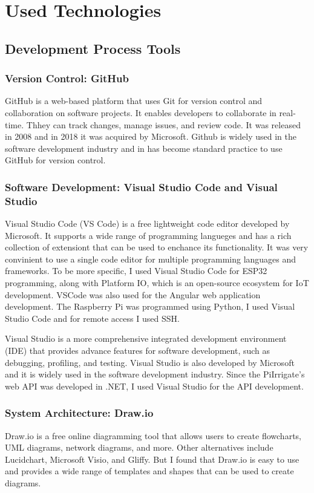 \chapter{Used Technologies}
\section{Development Process Tools}
\subsection{Version Control: GitHub}
GitHub is a web-based platform that uses Git for version control and collaboration on software projects.
It enables developers to collaborate in real-time. Thhey can track changes, manage issues, and review code.
It was released in 2008 and in 2018 it was acquired by Microsoft\cite{githubDefinition}.
Github is widely used in the software development industry and in has become standard practice to 
use GitHub for version control. 

\subsection{Software Development: Visual Studio Code and Visual Studio}
Visual Studio Code (VS Code) is a free lightweight code editor developed by Microsoft.
It supports a wide range of programming langueges and has a rich collection of extensiont that can be used to 
enchance its functionality\cite{vscode}.
It was very convinient to use a single code editor for multiple programming languages and frameworks.
To be more specific, I used Visual Studio Code for ESP32 programming, along with Platform IO, 
which is an open-source ecosystem for IoT development. VSCode was also used for the Angular web application 
development. The Raspberry Pi was programmed using Python, I used Visual Studio Code and for remote access
I used SSH.

Visual Studio is a more comprehensive integrated development environment (IDE) that provides advance features
for software development, such as debugging, profiling, and testing.
Visual Studio is also developed by Microsoft and it is widely used in the software development industry.
Since the PiIrrigate's web API was developed in .NET, I used Visual Studio for the API development\cite{vs}.

\subsection{System Architecture: Draw.io}
Draw.io is a free online diagramming tool that allows users to create flowcharts, 
UML diagrams, network diagrams, and more. 
Other alternatives include Lucidchart, Microsoft Visio, and Gliffy. But I found that Draw.io is easy to use
and provides a wide range of templates and shapes that can be used to create diagrams\cite{drawio}.

